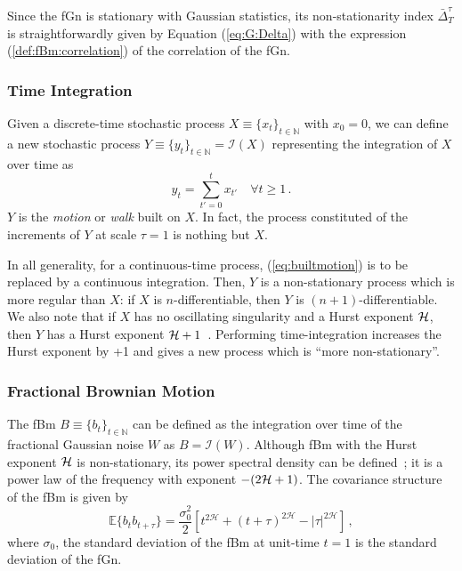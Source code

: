 \documentclass[aps,pra,groupedaddress,notitlepage]{revtex4-1}
\begin{document}
Since the fGn is stationary with Gaussian statistics, its non-stationarity index $\bar{\Delta}_T^{\tau}$ is straightforwardly given by Equation (\ref{eq:G:Delta}) with the expression (\ref{def:fBm:correlation}) of the correlation of the fGn.

\subsubsection{Time Integration}

Given a discrete-time stochastic process $X\equiv\{x_t\}_{t\in {\mathbb N}}$ with $x_0=0$, we can define a new stochastic process $Y\equiv\{y_t\}_{t\in {\mathbb N}} = {\mathcal I}(X)$ representing the integration of $X$ over time as
%
\begin{equation}
y_t = \sum_{t'=0}^{t} x_{t'} \quad \forall t\ge 1\,. \label{eq:builtmotion}
\end{equation}
%
$Y$ is the {\em motion} or {\em walk} built on $X$. In fact, the process constituted of the increments of $Y$ at scale $\tau=1$ is nothing but $X$.

In all generality, for a continuous-time process, (\ref{eq:builtmotion}) is to be replaced by a continuous integration. Then, $Y$ is a non-stationary process which is more regular than $X$: if $X$ is $n$-differentiable, then $Y$ is $(n+1)$-differentiable. We also note that if $X$ has no oscillating singularity and a Hurst exponent ${\cal H}$, then $Y$ has a Hurst exponent ${\cal H}+1$~\cite{Muzy:1993,Wendt:2009,Abry:2011}. Performing time-integration increases the Hurst exponent by +1 and gives a new process which is ``more non-stationary''. 


\subsubsection{Fractional Brownian Motion} 
\label{sec:theory:fBm}

The fBm $B\equiv\{b_t\}_{t\in{\mathbb N}}$ can be defined as the integration over time of the fractional Gaussian noise $W$ as $B={\mathcal I}(W)$. Although fBm with the Hurst exponent ${\cal H}$ is non-stationary, its power spectral density can be defined~\cite{Flandrin1989}; it is a power law of the frequency with exponent $-(2{\cal H}+1)$. The covariance structure of the fBm is given by
%
\begin{equation}
\mathbb{E} \{b_t b_{t+\tau} \} =  \frac{\sigma^2_0}{2} \left[t^{2\mathcal{H}}+ (t+\tau)^{2\mathcal{H}}-|\tau|^{2\mathcal{H}}\right] \,,
\label{eq:fBm:covariance}
\end{equation}
%
where $\sigma_0$, the standard deviation of the fBm at unit-time $t=1$ is the standard deviation of the fGn.
\end{document}

